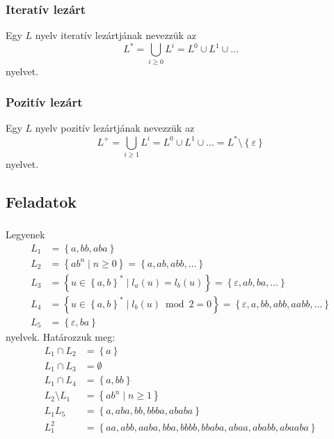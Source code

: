 \subsubsection{Iteratív lezárt}
\begin{definition*}
	Egy $L$ nyelv iteratív lezártjának nevezzük az
	\[
	L^* = \bigcup_{i \ge 0}{L^i}=L^0 \cup L^1 \cup \dots
	\]
	nyelvet.
\end{definition*}

\subsubsection{Pozitív lezárt}
\begin{definition*}
	Egy $L$ nyelv pozitív lezártjának nevezzük az
	\[
	L^+ = \bigcup_{i \ge 1}{L^i}=L^0 \cup L^1 \cup \dots = L^* \setminus \left\lbrace \varepsilon \right\rbrace 
	\]
	nyelvet.
\end{definition*}
\newpage
\subsection{Feladatok}
\subsubsection{}
Legyenek
\begin{align*}
	L_1 &= \left\lbrace a, bb, aba \right\rbrace \\
	L_2 &= \left\lbrace ab^n \; | \; n \ge 0 \right\rbrace = \left\lbrace a, ab, abb, \dots \right\rbrace  \\
	L_3 &= \left\lbrace u \in \left\lbrace a,b \right\rbrace ^* \; | \; l_a(u) = l_b(u) \right\rbrace
	= \left\lbrace \varepsilon, ab, ba, \dots \right\rbrace  \\
	L_4 &= \left\lbrace u \in \left\lbrace a,b \right\rbrace ^* \; | \; l_b(u) \bmod 2  = 0 \right\rbrace
	= \left\lbrace \varepsilon, a, bb, abb, aabb, \dots \right\rbrace \\
	L_5 &= \left\lbrace \varepsilon, ba \right\rbrace
\end{align*}
nyelvek. Határozzuk meg:
\begin{align*}
	L_1 \cap L_2 &= \left\lbrace a \right\rbrace \\
	L_1 \cap L_3 &= \emptyset \\
	L_1 \cap L_4 &= \left\lbrace a, bb \right\rbrace \\
	L_2 \setminus L_1 &= \left\lbrace ab^n \; | \; n \ge 1 \right\rbrace \\
	L_1L_5 &= \left\lbrace a, aba, bb, bbba, ababa \right\rbrace \\
	L_1^2 &= \left\lbrace aa, abb, aaba, bba, bbbb, bbaba, abaa, ababb, abaaba \right\rbrace 
\end{align*}
